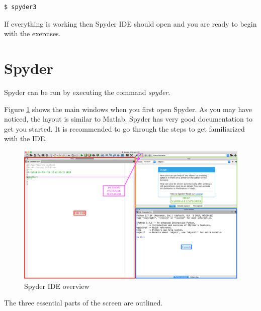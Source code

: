 \documentclass{cmc}
\begin{document}
\begin{lstlisting}[language=bash]
$ spyder3
\end{lstlisting}

If everything is working then Spyder IDE should open and you are ready
to begin with the exercises.

\newpage
\section{Spyder}
\label{sec:spyder}
Spyder can be run by executing the command \textit{spyder}.

Figure \ref{fig:spyder} shows the main windows when you first open
Spyder. As you may have noticed, the layout is similar to
Matlab. Spyder has very good documentation to get you started.  It is
recommended to go through the steps to get familiarized with the IDE.

\begin{figure}[h]
  \centering \includegraphics[width = \textwidth]{figures/Spyder.png}
  \caption{Spyder IDE overview}
  \label{fig:spyder}
\end{figure}

The three essential parts of the screen are outlined.
\end{document}
